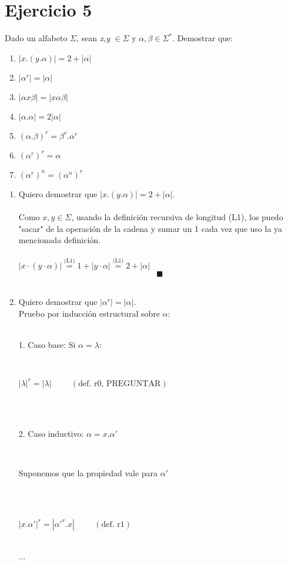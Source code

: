 \documentclass[12pt]{article}
\begin{document}
\section*{Ejercicio 5}
Dado un alfabeto $\Sigma$, sean \textit{x},\textit{y} $\in \Sigma$ y $\alpha,\beta \in \Sigma^*$. Demostrar que:
\begin{enumerate}[label=\Roman*.]
    \item $|x.(y.\alpha)| = 2 + |\alpha|$
    \item $|\alpha^r|=|\alpha|$
    \item $|\alpha x \beta| = |x \alpha \beta|$
    \item $|\alpha . \alpha| = 2 |\alpha|$
    \item $(\alpha . \beta)^r = \beta^r . \alpha^r$
    \item $(\alpha^r)^r = \alpha$
    \item $(\alpha^r)^n = (\alpha^n)^r$
\end{enumerate}

\begin{enumerate}[label=\roman*.,font=\itshape]
    \item {Quiero demostrar que $|x.(y.\alpha)| = 2 + |\alpha|$.
    \\
    \\
    {Como $x,y \in \Sigma$, usando la definición recursiva de longitud (L1), los puedo "sacar" de la operación de la cadena y sumar un 1 cada vez que uso la ya mencionada definición.}
    \\
    \\
$|x\cdot(y\cdot\alpha)|\overset{\text{(L1)}}{=} 1 + |y\cdot\alpha|\overset{\text{(L1)}}{=} 2 + |\alpha|$}
    \[
    \blacksquare
    \]
    \\ 
    \item {Quiero demostrar que $|\alpha^r|=|\alpha|$. 
    \\ Pruebo por inducción estructural sobre $\alpha$: 
    \\
    \\
    \centerline{1. Caso base: Si $\alpha = \lambda$:}
    \\
    \centerline{$|\lambda|^r =|\lambda| \hspace{1cm} (\text{def. r0, PREGUNTAR} )$}
    \\
    \\
    \centerline{2. Caso inductivo: $\alpha = x.\alpha'$}
    \\
    \centerline{Suponemos que la propiedad vale para $\alpha'$}
    \\
    \\
    \centerline{$|x.\alpha'|^r = |\alpha'^r.x| \hspace{1cm} (\text{def. r1} )$}
    \\
    ...}
\end{enumerate}
\end{document}
